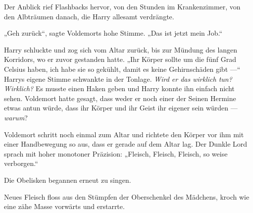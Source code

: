 Der Anblick rief Flashbacks hervor, von den Stunden im Krankenzimmer, von den Albträumen danach, die Harry allesamt verdrängte.

„Geh zurück“, sagte Voldemorts hohe Stimme.
„Das ist jetzt mein Job.“

Harry schluckte und zog sich vom Altar zurück, bis zur Mündung des langen Korridors, wo er zuvor gestanden hatte.
„Ihr Körper sollte um die fünf Grad Celsius haben, ich habe sie so gekühlt, damit es keine Gehirnschäden gibt —“ Harrys eigene Stimme schwankte in der Tonlage.
\emph{Wird er das wirklich tun? Wirklich?}
Es musste einen Haken geben und Harry konnte ihn einfach nicht sehen. Voldemort hatte gesagt, dass weder er noch einer der Seinen Hermine etwas antun würde, dass ihr Körper und ihr Geist ihr eigener sein würden — \emph{warum}?

Voldemort schritt noch einmal zum Altar und richtete den Körper vor ihm mit einer Handbewegung so aus, dass er gerade auf dem Altar lag. Der Dunkle Lord sprach mit hoher monotoner Präzision:
„Fleisch, Fleisch, Fleisch, so weise verborgen.“

Die Obelisken begannen erneut zu singen.



Neues Fleisch floss aus den Stümpfen der Oberschenkel des Mädchens, kroch wie eine zähe Masse vorwärts und erstarrte.

